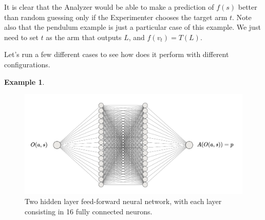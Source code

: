 \documentclass[11pt,a4paper,twoside]{report}
\newcommand{\+}{\textnormal{+} }
\theoremstyle{definition}
\newtheorem{myex}[mythm]{Example}
\numberwithin{equation}{chapter}
\begin{document}
  \par It is clear that the Analyzer would be able to make a prediction of
  $f(s)$ better than random guessing only if the Experimenter chooses the target
  arm $t$. Note also that the pendulum example is just a particular case of this
  example. We just need to set $t$ as the arm that outputs $L$, and
  $f(v_t)=T(L)$.

  Let's run a few different cases to see how does it perform with different
  configurations.

  \begin{myex}\label{MAB1ex}

    \begin{figure}
      \centering
      \includegraphics[scale=0.5]{figures/Analyzer1.pdf}
      \caption{Two hidden layer feed-forward neural network, with each layer
      consisting in 16 fully connected neurons.}
      \label{Analyzer1}
    \end{figure}



\end{myex}
\end{document}
